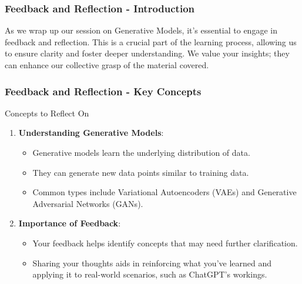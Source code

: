 \documentclass[aspectratio=169]{beamer}
\begin{document}
\begin{frame}[fragile]
    \frametitle{Feedback and Reflection - Introduction}
    As we wrap up our session on Generative Models, it's essential to engage in feedback and reflection. 
    This is a crucial part of the learning process, allowing us to ensure clarity and foster deeper understanding. 
    We value your insights; they can enhance our collective grasp of the material covered.
\end{frame}

\begin{frame}[fragile]
    \frametitle{Feedback and Reflection - Key Concepts}
    \begin{block}{Concepts to Reflect On}
        \begin{enumerate}
            \item \textbf{Understanding Generative Models}:
                \begin{itemize}
                    \item Generative models learn the underlying distribution of data.
                    \item They can generate new data points similar to training data.
                    \item Common types include Variational Autoencoders (VAEs) and Generative Adversarial Networks (GANs).
                \end{itemize}
            \item \textbf{Importance of Feedback}:
                \begin{itemize}
                    \item Your feedback helps identify concepts that may need further clarification.
                    \item Sharing your thoughts aids in reinforcing what you've learned and applying it to real-world scenarios, such as ChatGPT's workings.
                \end{itemize}
        \end{enumerate}
    \end{block}
\end{frame}
\end{document}
